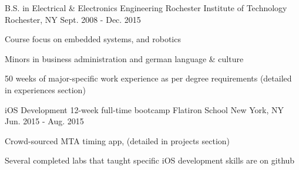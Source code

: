 
 \begin{cventries}
     \cventry
     {B.S. in Electrical \& Electronics Engineering} %
     {Rochester Institute of Technology} %
     {Rochester, NY} %
     {Sept. 2008 - Dec. 2015} %
     {\begin{cvitems} %
        \item {Course focus on embedded systems, and robotics}
        \item {Minors in business administration and german language \& culture}
        \item {50 weeks of major-specific work experience as per degree          requirements (detailed in experiences section)}
        \end{cvitems}}
     \cventry
     {iOS Development 12-week full-time bootcamp}
     {Flatiron School}
     {New York, NY}
     {Jun. 2015 - Aug. 2015}
     {\begin{cvitems}
        \item{Crowd-sourced MTA timing app, (detailed in projects section)}
        \item{Several completed labs that taught specific iOS development skills are on github}
        \end{cvitems}}
\end{cventries}
